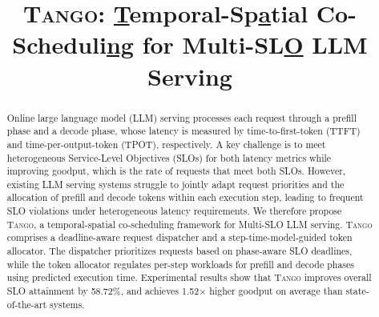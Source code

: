 \documentclass[conference]{IEEEtran}
\DeclareRobustCommand{\tango}{\textsc{Tango}\xspace}
\DeclareRobustCommand{\dispatcher}{deadline-aware request dispatcher\xspace}
\DeclareRobustCommand{\allocator}{step-time-model-guided token allocator\xspace}
\newcommand{\SJC}[1]{\textcolor{purple}{\textbf{SJC: #1}}}
\begin{document}
\title{\tango: \underline{T}emporal-Sp\underline{a}tial Co-Scheduli\underline{ng} for Multi-SL\underline{O} LLM Serving}

\maketitle

\begin{abstract}
Online large language model (LLM) serving processes each request through a prefill phase and a decode phase, whose latency is measured by time-to-first-token (TTFT) and time-per-output-token (TPOT), respectively.
A key challenge is to meet heterogeneous Service-Level Objectives (SLOs) for both latency metrics while improving goodput, which is the rate of requests that meet both SLOs.
However, existing LLM serving systems struggle to jointly adapt request priorities and the allocation of prefill and decode tokens within each execution step, leading to frequent SLO violations under heterogeneous latency requirements.
We therefore propose \tango, a temporal-spatial co-scheduling framework for Multi-SLO LLM serving. 
\tango comprises a \dispatcher{} and a \allocator{}. 
The dispatcher prioritizes requests based on phase-aware SLO deadlines, while the token allocator regulates per-step workloads for prefill and decode phases using predicted execution time. 
Experimental results show that \tango improves overall SLO attainment by 58.72\%, and achieves 1.52× higher goodput on average than state-of-the-art systems.
\end{abstract}







% 






\end{document}
